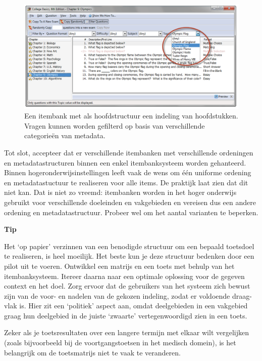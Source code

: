 \documentclass[
]{book}
\begin{document}
\begin{figure}[left]
\includegraphics[width=1\linewidth]{images/fig10} \caption{Een itembank met als hoofdstructuur een indeling van hoofdstukken. Vragen kunnen worden gefilterd op basis van verschillende categorieën van metadata.}\label{fig:unnamed-chunk-9}
\end{figure}

Tot slot, accepteer dat er verschillende itembanken met verschillende ordeningen en metadatastructuren binnen een enkel itembanksysteem worden gehanteerd. Binnen hogeronderwijsinstellingen leeft vaak de wens om één uniforme ordening en metadatastuctuur te realiseren voor alle items. De praktijk laat zien dat dit niet kan. Dat is niet zo vreemd: itembanken worden in het hoger onderwijs gebruikt voor verschillende doeleinden en vakgebieden en vereisen dus een andere ordening en metadatastructuur. Probeer wel om het aantal varianten te beperken.

\textbf{Tip}

Het `op papier' verzinnen van een benodigde structuur om een bepaald toetsdoel te realiseren, is heel moeilijk. Het beste kun je deze structuur bedenken door een pilot uit te voeren. Ontwikkel een matrijs en een toets met behulp van het itembanksysteem. Itereer daarna naar een optimale oplossing voor de gegeven context en het doel. Zorg ervoor dat de gebruikers van het systeem zich bewust zijn van de voor- en nadelen van de gekozen indeling, zodat er voldoende draag- vlak is. Hier zit een `politiek' aspect aan, omdat deelgebieden in een vakgebied graag hun deelgebied in de juiste `zwaarte' vertegenwoordigd zien in een toets.

Zeker als je toetsresultaten over een langere termijn met elkaar wilt vergelijken (zoals bijvoorbeeld bij de voortgangstoetsen in het medisch domein), is het belangrijk om de toetsmatrijs niet te vaak te veranderen.
\end{document}
